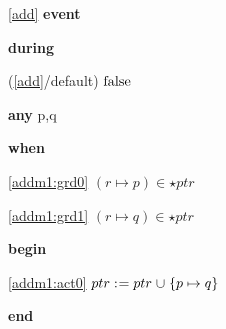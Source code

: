 \noindent \ref{add}  \textbf{event}
\begin{block}
  \item   \textbf{during}
  \begin{block}
  \item[ (\ref{add}/default) ]{$\text{false} $} %
  \end{block}
  \item   \textbf{any} p,q
  \item   \textbf{when}
  \begin{block}
  \item[ \eqref{addm1:grd0} ]{$(r \mapsto p) \in \star{ptr} $} %
  \item[ \eqref{addm1:grd1} ]{$(r \mapsto q) \in \star{ptr} $} %
  \end{block}
  \item   \textbf{begin}
  \begin{block}
  \item[ \eqref{addm1:act0} ]{$ptr \mathrel{:\mkern1mu=} ptr \mathbin{\mkern1mu\cup\mkern1mu} \{ p \mapsto q \} $} %
  \end{block}
  \item   \textbf{end} \\
\end{block}

